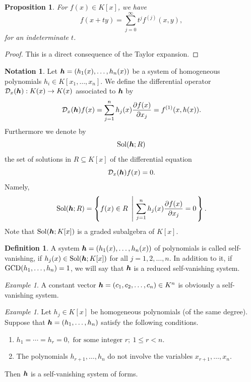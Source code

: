 \documentclass[12pt]{article}
\newtheorem{proposition}[theorem]{Proposition}
\theoremstyle{definition}
\newtheorem{definition}[theorem]{Definition}
\newtheorem{notation}[theorem]{Notation}
\theoremstyle{remark}
\newtheorem{example}[theorem]{Example}
\def\cD{{\cal D}}
\def\sol{{\rm Sol}}
\def\boldh{\mbox{\boldmath $h$}}
\def\pa{\partial}
\begin{document}
\begin{proposition}  \label{taylor_expansion}  %
For $f(x) \in K[x]$, we have  
\[f(x+ty)= \sum _{j=0}^{\infty}t^jf^{(j)}(x,y),\]
for an indeterminate  $t$.  
\end{proposition}
\begin{proof}
This is a direct consequence of the Taylor expansion.  
\end{proof}

\begin{notation}  \label{notation_of_svs}      %
Let  $\boldh=(h_1(x), \ldots, h_n(x))$ be a system of homogeneous polynomials
$h_i \in K[x_1, \ldots, x_n]$.   
We define the differential operator $\cD_x(\boldh): K(x) \rightarrow K(x)$ associated to $\boldh$ by 
\[\cD _x (\boldh)f(x) = \sum _{j=1}^{n} h_j(x)\frac{\pa f(x)}{\pa x_j}=f^{(1)}(x,h(x)).\] 
Furthermore we denote by 
\[\sol(\boldh; R)\]
the set of solutions in $R \subseteq K[x]$ of the differential equation 
\[\cD_x(\boldh) f(x)=0.\]
Namely, 
\[\sol(\boldh; R) = \left\{ f(x) \in R \ \left|\   \sum _{j=1}^n h_j(x) 
\frac{\pa f(x)}{\pa x_j}=0 \right. \right\}.\]
Note that $\sol(\boldh;K[x])$ is a graded  subalgebra  of $K[x]$.
\end{notation}


\begin{definition}  \label{self_vanishing_sys}    %
A system  $\boldh=(h_1(x), \ldots, h_n(x))$  of polynomials is called self-vanishing, if  $h_j(x) \in \sol(\boldh; K[x])$ for 
all $j=1,2, \ldots, n$.  In addition to it, if ${\rm GCD}(h_1, \ldots, h_n)=1$, 
we will say that $\boldh$ is a reduced self-vanishing system.
\end{definition}


\begin{example}    %
A constant vector  $\boldh=(c_1, c_2,  \ldots, c_n) \in K^n$ is  obviously a self-vanishing system. 
%
\end{example}


\begin{example}  \label{splitting_case}   %
Let $h_j \in K[x]$ be homogeneous polynomials (of the same degree).  
Suppose that $\boldh = (h_1, \ldots, h_n)$ satisfy the following conditions. 
\begin{enumerate}
\item
$h_1 = \cdots = h_r = 0, \mbox{ for some integer } r;   \ 1 \leq  r < n. $
\item
The polynomials $h_{r+1}, \ldots,  h_{n}$ do not involve the 
variables $x_{r+1}, \ldots, x_n$. 
\end{enumerate}
Then  $\boldh$ is a self-vanishing system of forms.    
%
\end{example}
\end{document}

